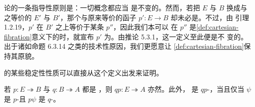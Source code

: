 \begin{remark}\label{rem:equivalence-invariance}
\trInfinityCategory{}论的一条指导性原则是：一切\trInfinityCategory{}概念都应当
是\trEquivalence{}不变的。然而，若把 $E$ 与 $B$ 换成与之等价的%
\trInfinityCategory{} $E'$ 与 $B'$，那个与原来等价的函子 $p'\colon E\to B$
却未必是\trIsofibration。不过，由
引理 1.2.19，$p'$ 在 $B'$ 之上等价于某条\trIsofibration{} $p''$，因此我们本可以
在 $p''$ 是\cref{def:cartesian-fibration}意义下的\trIsofibration{}时，就宣布
$p'$ 为\trCartesianFibration。由推论 5.3.1，这一定义至此便是\trEquivalence{}不
变的。出于诸如命题 6.3.14 之类的技术性原因，我们更愿意让%
\cref{def:cartesian-fibration}保持其原貌。
\end{remark}

\trCartesianFibration{}的某些稳定性性质可以直接从这个定义出发来证明。

\begin{lemma}\label{lem:composite-cartesian-fibration}
若 $p\colon E\twoheadrightarrow B$ 与 $q\colon B\twoheadrightarrow A$ 都是%
\trCartesianFibration，则 $qp\colon E\twoheadrightarrow A$ 亦然。此外，%
\trNaturalTransformation
{}
是 $qp$-\trCartesian，当且仅当 $\psi$ 是 $p$-\trCartesian{}且 $p\psi$ 是
$q$-\trCartesian。
\end{lemma}

